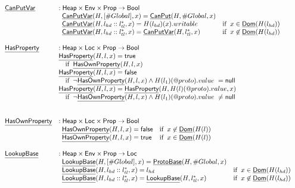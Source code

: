 \documentclass{article}
\makeatletter
\newcommand{\SF}[1]{\mbox{\textsf{#1}}}
\newcommand{\ifc}[1]{{\rm if}\begin{array}[t]{l}#1\end{array}}
\newcommand{\Heap}{\SF{Heap}}
\newcommand{\Loc}{\SF{Loc}}
\newcommand{\Prop}{\SF{Prop}}
\newcommand{\hf}[1]{\underline{\sf #1}}
\newcommand{\varloc}[1]{\##1}
\newcommand{\varprop}[1]{@#1}
\newcommand{\vtrue}{\SF{true}}
\newcommand{\vfalse}{\SF{false}}
\makeatother
\begin{document}
\[\begin{array}{ll}
\hf{CanPutVar} & : \Heap \times \SF{Env} \times \Prop \rightarrow \SF{Bool}\\
&
\begin{array}{ll}
  \hf{CanPutVar}(H,[\varloc{Global}],x)
  =  \hf{CanPut}(H,\varloc{Global},x) \\
\hf{CanPutVar}(H,l_{hd}::l^{*}_{tl},x)
  =  H(l_{hd})(x).writable & \ifc{x\in\hf{Dom}(H(l_{hd}))} \\
\hf{CanPutVar}(H,l_{hd}::l^{*}_{tl},x)
  =  \hf{CanPutVar}(H,l^{*}_{tl},x) & \ifc{x\not\in\hf{Dom}(H(l_{hd}))} \\
\end{array}\\
\\

\hf{HasProperty} & : \Heap \times \Loc \times \Prop \rightarrow \SF{Bool} \\
& \hf{HasProperty}(H,l,x) = \vtrue \\
& \quad\ifc{\hf{HasOwnProperty}(H,l,x)} \\
& \hf{HasProperty}(H,l,x) = \vfalse \\
& \quad\ifc{\lnot\hf{HasOwnProperty}(H,l,x) \land H(l_1)(\varprop{proto}).value\ = \SF{null}}\\
& \hf{HasProperty}(H,l,x) = \hf{HasProperty}(H,H(l)(\varprop{proto}).value,x)\\
& \quad\ifc{\lnot\hf{HasOwnProperty}(H,l,x) \land H(l_1)(\varprop{proto}).value\ \neq \SF{null}} \\
\\
\\

\hf{HasOwnProperty} & : \Heap \times \Loc \times \Prop \rightarrow \SF{Bool} \\
&
\begin{array}{ll}
  \hf{HasOwnProperty}(H,l,x) = \vfalse & \ifc{x\not\in\hf{Dom}(H(l))} \\
  \hf{HasOwnProperty}(H,l,x) = \vtrue & \ifc{x\in\hf{Dom}(H(l))} \\
\end{array}\\
\\
\hf{LookupBase} & : \Heap \times \SF{Env} \times \Prop \rightarrow \Loc \\
&
\begin{array}{ll}
\hf{LookupBase}(H,[\varloc{Global}],x)
= \hf{ProtoBase}(H, \varloc{Global}, x) \\
\hf{LookupBase}(H,l_{hd}::l_{tl}^{*},x)
= l_{hd} & \ifc{x\in\hf{Dom}(H(l_{hd}))} \\
\hf{LookupBase}(H,l_{hd}::l_{tl}^{*},x)
= \hf{LookupBase}(H, l_{tl}^{*},x) & \ifc{x\not\in\hf{Dom}(H(l_{hd}))} \\
\end{array}\\
\\
\end{array}
\]
\end{document}
